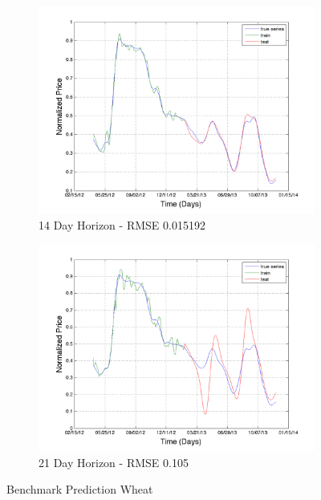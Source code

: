 \begin{figure}
       \hfill
       
        \begin{subfigure}[b]{0.5\textwidth}
                \includegraphics[width=\textwidth]{img/model/wheat/model1/pred_14}
                \caption{14 Day Horizon - RMSE 0.015192}
                \label{fig:mouse}
        \end{subfigure}%
         \begin{subfigure}[b]{0.5\textwidth}
                \includegraphics[width=\textwidth]{img/model/wheat/model1/pred_21}
                \caption{21 Day Horizon - RMSE  0.105}
                \label{fig:long_wheat_price}
        \end{subfigure}
        \caption{Benchmark Prediction Wheat}
        \label{fig:wheat_1}
\end{figure}





